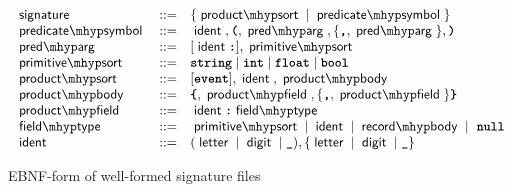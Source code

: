 \begin{figure}
	\[
		\begin{array}{lll}
			\ebnfr{signature}              & ::= & \{ \ebnfr{product \mhyp sort} \mid \ebnfr{predicate \mhyp symbol}  \}                                        \\
			\ebnfr{predicate \mhyp symbol} & ::= & \ebnfr{ident}, \ebnft{(}, \ebnfr{pred \mhyp arg}, \{ \ebnft{,}, \ebnfr{pred \mhyp arg} \}, \ebnft{)}         \\
			\ebnfr{pred \mhyp arg}         & ::= & [ \ebnfr{ident} \ebnft{:} ], \ebnfr{primitive \mhyp sort}                                                    \\
			\ebnfr{primitive \mhyp sort}   & ::= & \ebnft{string} \mid \ebnft{int} \mid \ebnft{float} \mid \ebnft{bool}                                         \\
			\ebnfr{product \mhyp sort}     & ::= & [\ebnft{event}], \ebnfr{ident}, \ebnfr{product \mhyp body}                                                   \\
			\ebnfr{product \mhyp body}     & ::= & \ebnft{\{}, \ebnfr{product \mhyp field}, \{\ebnft{,}, \ebnfr{product \mhyp field} \} \ebnft{\}}              \\
			\ebnfr{product \mhyp field}    & ::= & \ebnfr{ident} \ebnft{:} \ebnfr{field \mhyp type}                                                             \\
			\ebnfr{field \mhyp type}       & ::= & \ebnfr{primitive \mhyp sort} \mid \ebnfr{ident} \mid \ebnfr{record \mhyp body}  \mid\ \ebnft{null}           \\
			\ebnfr{ident}                  & ::= & (\ebnfr{letter} \mid \ebnfr{digit} \mid \ebnft{\_}), \{ \ebnfr{letter} \mid \ebnfr{digit} \mid \ebnft{\_} \} \\
		\end{array}
	\]
	\caption{EBNF-form of well-formed signature files}
	\label{fig:extended_signatures_ebnf}
\end{figure}

